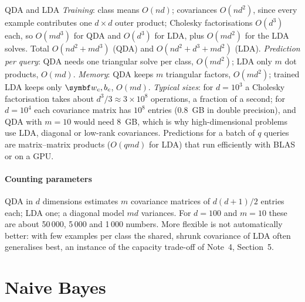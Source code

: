\documentclass[11pt]{article}
\newcommand{\w}{\vect{w}}
\begin{document}
\begin{runtime}{QDA and LDA}
\emph{Training}: class means $O(nd)$; covariances $O(nd^2)$, since every example contributes one $d \times d$ outer
product; Cholesky factorisations $O(d^3)$ each, so $O(md^3)$ for QDA and $O(d^3)$ for LDA, plus $O(md^2)$ for the LDA
solves. Total $O(nd^2 + md^3)$ (QDA) and $O(nd^2 + d^3 + md^2)$ (LDA). \emph{Prediction per query}: QDA needs one
triangular solve per class, $O(md^2)$; LDA only $m$ dot products, $O(md)$. \emph{Memory}: QDA keeps $m$ triangular
factors, $O(md^2)$; trained LDA keeps only $\w_c, b_c$, $O(md)$. \emph{Typical sizes}: for $d = 10^3$ a Cholesky
factorisation takes about $d^3/3 \approx 3 \times 10^8$ operations, a fraction of a second; for $d = 10^4$ each
covariance matrix has $10^8$ entries (0.8~GB in double precision), and QDA with $m = 10$ would need 8~GB, which is why
high-dimensional problems use LDA, diagonal or low-rank covariances. Predictions for a batch of $q$ queries are
matrix--matrix products ($O(qmd)$ for LDA) that run efficiently with BLAS or on a GPU.
\end{runtime}

\paragraph{Counting parameters} QDA in $d$ dimensions estimates $m$ covariance matrices of $d(d+1)/2$ entries each;
LDA one; a diagonal model $md$ variances. For $d = 100$ and $m = 10$ these are about 50\,000, 5\,000 and 1\,000
numbers. More flexible is not automatically better: with few examples per class the shared, shrunk covariance of LDA
often generalises best, an instance of the capacity trade-off of Note~4, Section~5.

\section{Naive Bayes}\label{sec:naive}
\end{document}
